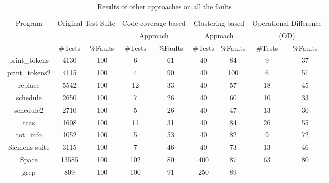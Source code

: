 \documentclass{sig-alternate}
\begin{document}
\begin{table}[htbp]
\caption{Results of other approaches on all the
faults}\label{tab:other} \center
\begin{tabular}{|c|c|c|c|c|c|c|c|c|}

\hline Program   & \multicolumn{2}{c}{Original Test Suite} \vline &
\multicolumn{2}{c}{Code-coverage-based} \vline &
\multicolumn{2}{c}{Clustering-based} \vline &
\multicolumn{2}{c}{Operational Difference} \vline
    \\

& \multicolumn{2}{c}{} \vline & \multicolumn{2}{c}{Approach} \vline
& \multicolumn{2}{c}{Approach} \vline & \multicolumn{2}{c}{(OD)}
\vline
   \\

 \cline{2-9}  & \#Tests &   \%Faults & \#Tests &   \%Faults &
\#Tests &   \%Faults & \#Tests &   \%Faults  \\


\hline  print\_tokens   &   4130    &   100 &   6   &   61  &   40  &   84  &   9   &   37   \\
\hline  print\_tokens2  &   4115    &   100 &   4   &   90  &   40  &   100 &   6   &   51    \\
\hline  replace &   5542    &   100 &   12  &   33  &   40  &   57  &   18  &   45    \\
\hline  schedule    &   2650    &   100 &   7   &   26  &   40  &   60  &   10  &   33   \\
\hline  schedule2   &   2710    &   100 &   5   &   26  &   40  &   47  &   13  &   30    \\
\hline  tcas    &   1608    &   100 &   11  &   31  &   40  &   84  &   26  &   55    \\
\hline  tot\_info &   1052    &   100 &   5   &   53  &   40  &   82  &   9   &   72   \\
\hline  Siemens suite   &   3115    &   100 &   7   &   46  &   40  &   73  &   13  &   46   \\
\hline  Space   &   13585   &   100 &   102 &   80  &   400 &   87  &   63  &   80  \\
\hline  grep    &   809 &   100 &   100 &   91  &   250 &   89  &   -   &   -     \\

\hline
\end{tabular}
\end{table}
\end{document}
